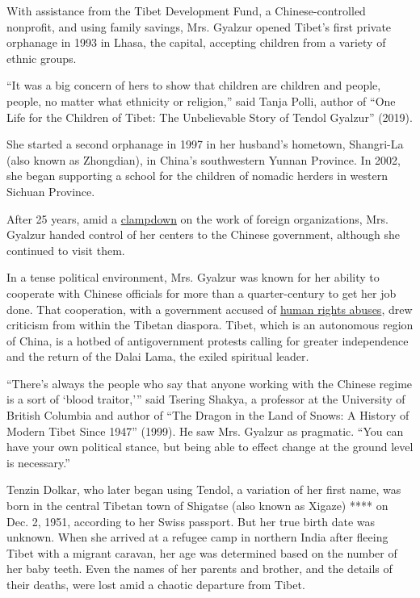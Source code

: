 With assistance from the Tibet Development Fund, a Chinese-controlled
nonprofit, and using family savings, Mrs. Gyalzur opened Tibet's first
private orphanage in 1993 in Lhasa, the capital, accepting children from
a variety of ethnic groups.

``It was a big concern of hers to show that children are children and
people, people, no matter what ethnicity or religion,'' said Tanja
Polli, author of ``One Life for the Children of Tibet: The Unbelievable
Story of Tendol Gyalzur'' (2019).

She started a second orphanage in 1997 in her husband's hometown,
Shangri-La (also known as Zhongdian), in China's southwestern Yunnan
Province. In 2002, she began supporting a school for the children of
nomadic herders in western Sichuan Province.

After 25 years, amid a
\href{https://www.nytimes.com/2016/04/29/world/asia/china-foreign-ngo-law.html}{clampdown}
on the work of foreign organizations, Mrs. Gyalzur handed control of her
centers to the Chinese government, although she continued to visit them.

In a tense political environment, Mrs. Gyalzur was known for her ability
to cooperate with Chinese officials for more than a quarter-century to
get her job done. That cooperation, with a government accused of
\href{https://www.nytimes.com/2012/11/03/world/asia/un-rights-official-faults-china-on-tibetan-suppression.html}{human
rights abuses}, drew criticism from within the Tibetan diaspora. Tibet,
which is an autonomous region of China, is a hotbed of antigovernment
protests calling for greater independence and the return of the Dalai
Lama, the exiled spiritual leader.

``There's always the people who say that anyone working with the Chinese
regime is a sort of `blood traitor,''' said Tsering Shakya, a professor
at the University of British Columbia and author of ``The Dragon in the
Land of Snows: A History of Modern Tibet Since 1947'' (1999). He saw
Mrs. Gyalzur as pragmatic. ``You can have your own political stance, but
being able to effect change at the ground level is necessary.''

Tenzin Dolkar, who later began using Tendol, a variation of her first
name, was born in the central Tibetan town of Shigatse (also known as
Xigaze) **** on Dec. 2, 1951, according to her Swiss passport. But her
true birth date was unknown. When she arrived at a refugee camp in
northern India after fleeing Tibet with a migrant caravan, her age was
determined based on the number of her baby teeth. Even the names of her
parents and brother, and the details of their deaths, were lost amid a
chaotic departure from Tibet.

